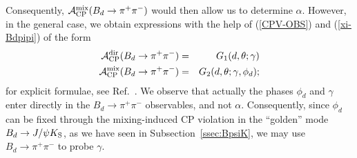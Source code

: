 \documentclass[12pt]{article}
\begin{document}
Consequently, ${\cal A}_{\rm CP}^{\rm mix}(B_d\to\pi^+\pi^-)$ would then
allow us to determine $\alpha$. However, in the general case, we obtain 
expressions with the help of (\ref{CPV-OBS}) and (\ref{xi-Bdpipi}) of the form
\begin{eqnarray}
{\cal A}_{\rm CP}^{\rm dir}(B_d\to \pi^+\pi^-)&=&
G_1(d,\theta;\gamma) \label{CP-Bpipi-dir-gen}\\
{\cal A}_{\rm CP}^{\rm mix}(B_d\to \pi^+\pi^-)&=&
G_2(d,\theta;\gamma,\phi_d);\label{CP-Bpipi-mix-gen}
\end{eqnarray}
for explicit formulae, see Ref.~\cite{RF-BsKK}. We observe that actually the 
phases $\phi_d$ and $\gamma$ enter directly in the $B_d\to\pi^+\pi^-$ 
observables, and not $\alpha$. Consequently, since $\phi_d$ can be fixed 
through the mixing-induced CP violation in the ``golden'' mode 
$B_d\to J/\psi K_{\rm S}$, as we have seen in Subsection~\ref{ssec:BpsiK},
we may use $B_d\to\pi^+\pi^-$ to probe $\gamma$. 
\end{document}
